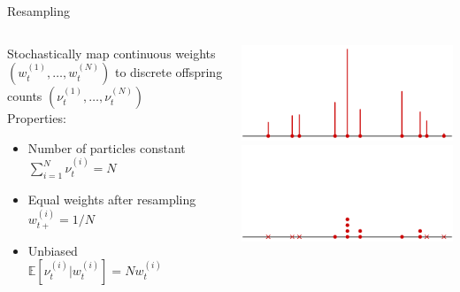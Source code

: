 \documentclass[aspectratio=169]{beamer}
\theoremstyle{definition}
\newcommand{\E}{\mathbb{E}}
\newcommand{\vt}[2][t]{\nu_{#1}^{(#2)}}
\newcommand{\wt}[2][t]{w_{#1}^{(#2)}}
\begin{document}
\begin{frame}{Resampling}
\begin{columns}
\begin{column}{0.45\textwidth}
Stochastically map continuous weights $(\wt{1}, \dots, \wt{N})$ to discrete offspring counts $(\vt{1},\dots, \vt{N})$\\[10pt]
Properties:
\begin{itemize}
\item Number of particles constant $\sum_{i=1}^N \vt{i} =N$
\item Equal weights after resampling $w_{t+}^{(i)} = 1/N$
\item Unbiased\\ $\E[\vt{i} | \wt{i}] = N\wt{i}$
\end{itemize}

\end{column}
\begin{column}{0.45\textwidth}
\centering
{}
\includegraphics[width=\textwidth]{resample1.pdf} \\
\includegraphics[width=\textwidth]{resample2.pdf}
\end{column}
\end{columns}
\end{frame}
\end{document}
